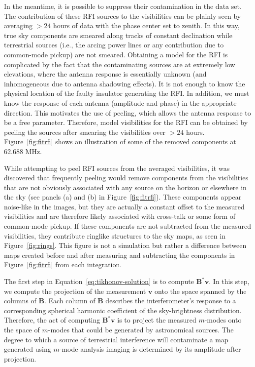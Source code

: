 \documentclass[twocolumn]{aastex61}
\renewcommand{\b}{\pmb}
\begin{document}
In the meantime, it is possible to suppress their contamination in the data set. The contribution of
these RFI sources to the visibilities can be plainly seen by averaging $>24$ hours of data with the
phase center set to zenith. In this way, true sky components are smeared along tracks of constant
declination while terrestrial sources (i.e., the arcing power lines or any contribution due to
common-mode pickup) are not smeared.  Obtaining a model for the RFI is complicated by the fact that
the contaminating sources are at extremely low elevations, where the antenna response is essentially
unknown (and inhomogeneous due to antenna shadowing effects). It is not enough to know the physical
location of the faulty insulator generating the RFI. In addition, we must know the response of each
antenna (amplitude and phase) in the appropriate direction. This motivates the use of peeling, which
allows the antenna response to be a free parameter.  Therefore, model visibilities for the RFI can
be obtained by peeling the sources after smearing the visibilities over $>24$ hours.
Figure~\ref{fig:fitrfi} shows an illustration of some of the removed components at 62.688 MHz.

While attempting to peel RFI sources from the averaged visibilities, it was discovered that
frequently peeling would remove components from the visibilities that are not obviously associated
with any source on the horizon or elsewhere in the sky (see panels (a) and (b) in
Figure~\ref{fig:fitrfi}).  These components appear noise-like in the images, but they are actually a
constant offset to the measured visibilities and are therefore likely associated with cross-talk or
some form of common-mode pickup. If these components are not subtracted from the measured
visibilities, they contribute ringlike structures to the sky maps, as seen in
Figure~\ref{fig:rings}. This figure is not a simulation but rather a difference between maps created
before and after measuring and subtracting the components in Figure~\ref{fig:fitrfi} from each
integration.

The first step in Equation~\ref{eq:tikhonov-solution} is to compute $\b B^*\b v$. In this step, we
compute the projection of the measurement $\b v$ onto the space spanned by the columns of $\b B$.
Each column of $\b B$ describes the interferometer's response to a corresponding spherical harmonic
coefficient of the sky-brightness distribution. Therefore, the act of computing $\b B^*\b v$ is to
project the measured $m$-modes onto the space of $m$-modes that could be generated by astronomical
sources. The degree to which a source of terrestrial interference will contaminate a map generated
using $m$-mode analysis imaging is determined by its amplitude after projection.
\end{document}
